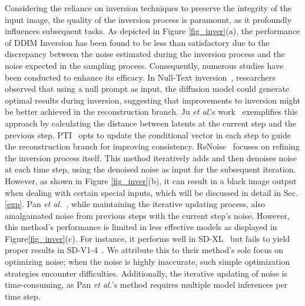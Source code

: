 \documentclass[letterpaper]{article} \usepackage{aaai25}  \usepackage{times}  \usepackage{helvet}  \usepackage{courier}  \usepackage[hyphens]{url}  \usepackage{graphicx} \urlstyle{rm} \def\UrlFont{\rm}  \usepackage{natbib}  \usepackage{caption} \frenchspacing  \setlength{\pdfpagewidth}{8.5in} \setlength{\pdfpageheight}{11in} \usepackage{algorithm}
\begin{document}
Considering the reliance on inversion techniques to preserve the integrity of the input image, the quality of the inversion process is paramount, as it profoundly influences subsequent tasks.
As depicted in Figure \ref{fig_inver}(a), the performance of DDIM Inversion has been found to be less than satisfactory due to the discrepancy between the noise estimated during the inversion process and the noise expected in the sampling process.
Consequently, numerous studies have been conducted to enhance its efficacy.
In Null-Text inversion~\cite{mokady2023null}, researchers observed that using a null prompt as input, the diffusion model could generate optimal results during inversion, suggesting that improvements to inversion might be better achieved in the reconstruction branch.
Ju \emph{et al}.'s work~\cite{ju2023direct} exemplifies this approach by calculating the distance between latents at the current step and the previous step.
PTI~\cite{dong2023prompt} opts to update the conditional vector in each step to guide the reconstruction branch for improving consistency.
ReNoise~\cite{garibi2024renoise} focuses on refining the inversion process itself. This method iteratively adds and then denoises noise at each time step, using the denoised noise as input for the subsequent iteration. However, as shown in Figure \ref{fig_inver}(b), it can result in a black image output when dealing with certain special inputs, which will be discussed in detail in Sec.\,\ref{exp}.
Pan \emph{et al.}~\cite{pan2023effective}, while maintaining the iterative updating process, also amalgamated noise from previous steps with the current step's noise. However, this method's performance is limited in less effective models as displayed in Figure\ref{fig_inver}(c). For instance, it performs well in SD-XL~\cite{podell2023sdxl} but fails to yield proper results in SD-V1-4~\cite{rombach2022high}. We attribute this to their method's sole focus on optimizing noise; when the noise is highly inaccurate, such simple optimization strategies encounter difficulties. Additionally, the iterative updating of noise is time-consuming, as Pan \emph{et al.}'s method requires multiple model inferences per time step.
\end{document}
